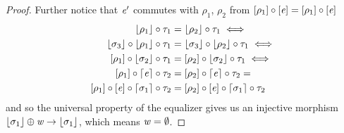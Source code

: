 \begin{proof}
    Further notice that $\mathit{e}'$ commutes with $\rho_1$, $\rho_2$ from $[\rho_1] \circ [\mathit{e}] = [\rho_1] \circ [\mathit{e}]$
    \begin{align*}
        \concL{\rho_1} \comp \tau_1 &= \concL{\rho_2} \comp \tau_1 \iff \\
        \concL{\sigma_3} \comp \concL{\rho_1} \comp \tau_1   &= \concL{\sigma_3} \comp \concL{\rho_2} \comp \tau_1 \iff \\
        \anyL{\rho_1} \comp \concL{\sigma_2} \comp \tau_1      &= \anyL{\rho_2} \comp \concL{\sigma_2} \comp \tau_1 \iff \\
        \anyL{\rho_1} \comp \varL\ve \comp \tau_2  &= \anyL{\rho_2} \comp \varL\ve \comp \tau_2 =  \\
        \anyL{\rho_1} \comp \anyL\ve \comp \varL{\sigma_1} \comp \tau_2  &= \anyL{\rho_2} \comp \anyL\ve \comp \varL{\sigma_1} \comp \tau_2
    \end{align*}
    and so the universal property of the equalizer gives us an injective morphism $\lfloor\sigma_1\rfloor \oplus \mathit{w} \to \lfloor\sigma_1\rfloor$, which means $\mathit{w} = \emptyset$. 
\end{proof}

